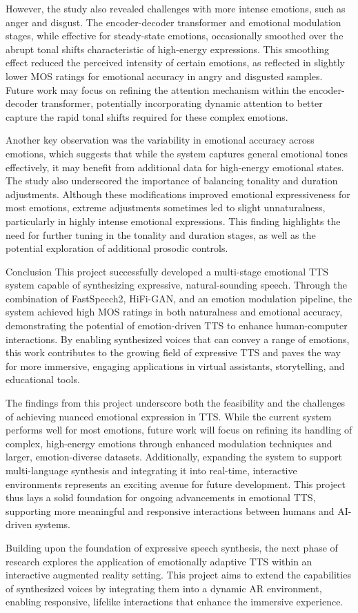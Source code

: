 However, the study also revealed challenges with more intense emotions, such as anger and disgust. The encoder-decoder transformer and emotional modulation stages, while effective for steady-state emotions, occasionally smoothed over the abrupt tonal shifts characteristic of high-energy expressions. This smoothing effect reduced the perceived intensity of certain emotions, as reflected in slightly lower MOS ratings for emotional accuracy in angry and disgusted samples. Future work may focus on refining the attention mechanism within the encoder-decoder transformer, potentially incorporating dynamic attention to better capture the rapid tonal shifts required for these complex emotions.

Another key observation was the variability in emotional accuracy across emotions, which suggests that while the system captures general emotional tones effectively, it may benefit from additional data for high-energy emotional states. The study also underscored the importance of balancing tonality and duration adjustments. Although these modifications improved emotional expressiveness for most emotions, extreme adjustments sometimes led to slight unnaturalness, particularly in highly intense emotional expressions. This finding highlights the need for further tuning in the tonality and duration stages, as well as the potential exploration of additional prosodic controls.

Conclusion
This project successfully developed a multi-stage emotional TTS system capable of synthesizing expressive, natural-sounding speech. Through the combination of FastSpeech2, HiFi-GAN, and an emotion modulation pipeline, the system achieved high MOS ratings in both naturalness and emotional accuracy, demonstrating the potential of emotion-driven TTS to enhance human-computer interactions. By enabling synthesized voices that can convey a range of emotions, this work contributes to the growing field of expressive TTS and paves the way for more immersive, engaging applications in virtual assistants, storytelling, and educational tools.

The findings from this project underscore both the feasibility and the challenges of achieving nuanced emotional expression in TTS. While the current system performs well for most emotions, future work will focus on refining its handling of complex, high-energy emotions through enhanced modulation techniques and larger, emotion-diverse datasets. Additionally, expanding the system to support multi-language synthesis and integrating it into real-time, interactive environments represents an exciting avenue for future development. This project thus lays a solid foundation for ongoing advancements in emotional TTS, supporting more meaningful and responsive interactions between humans and AI-driven systems.

Building upon the foundation of expressive speech synthesis, the next phase of research explores the application of emotionally adaptive TTS within an interactive augmented reality setting. This project aims to extend the capabilities of synthesized voices by integrating them into a dynamic AR environment, enabling responsive, lifelike interactions that enhance the immersive experience.
